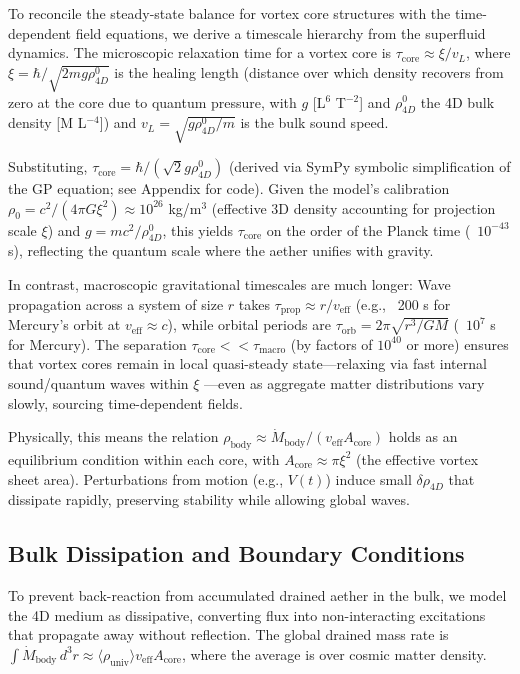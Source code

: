 \documentclass{article}
\begin{document}
To reconcile the steady-state balance for vortex core structures with the time-dependent field equations, we derive a timescale hierarchy from the superfluid dynamics. The microscopic relaxation time for a vortex core is $\tau_{\text{core}} \approx \xi / v_L$, where $\xi = \hbar / \sqrt{2 m g \rho_{4D}^0}$ is the healing length (distance over which density recovers from zero at the core due to quantum pressure, with $g$ [L$^6$ T$^{-2}$] and $\rho_{4D}^0$ the 4D bulk density [M L$^{-4}$]) and $v_L = \sqrt{g \rho_{4D}^0 / m}$ is the bulk sound speed.

Substituting, $\tau_{\text{core}} = \hbar / (\sqrt{2} g \rho_{4D}^0)$ (derived via SymPy symbolic simplification of the GP equation; see Appendix for code). Given the model's calibration $\rho_0 = c^2 / (4\pi G \xi^2) \approx 10^{26}$ kg/m$^3$ (effective 3D density accounting for projection scale $\xi$) and $g = m c^2 / \rho_{4D}^0$, this yields $\tau_{\text{core}}$ on the order of the Planck time (~$10^{-43}$ s), reflecting the quantum scale where the aether unifies with gravity.

In contrast, macroscopic gravitational timescales are much longer: Wave propagation across a system of size $r$ takes $\tau_{\text{prop}} \approx r / v_{\text{eff}}$ (e.g., ~200 s for Mercury's orbit at $v_{\text{eff}} \approx c$), while orbital periods are $\tau_{\text{orb}} = 2\pi \sqrt{r^3 / G M}$ (~$10^{7}$ s for Mercury). The separation $\tau_{\text{core}} << \tau_{\text{macro}}$ (by factors of $10^{40}$ or more) ensures that vortex cores remain in local quasi-steady state---relaxing via fast internal sound/quantum waves within $\xi$ ---even as aggregate matter distributions vary slowly, sourcing time-dependent fields.

Physically, this means the relation $\rho_{\text{body}} \approx \dot{M}_{\text{body}} / (v_{\text{eff}} A_{\text{core}})$ holds as an equilibrium condition within each core, with $A_{\text{core}} \approx \pi \xi^2$ (the effective vortex sheet area). Perturbations from motion (e.g., $V(t)$) induce small $\delta \rho_{4D}$ that dissipate rapidly, preserving stability while allowing global waves.

\subsection{Bulk Dissipation and Boundary Conditions}

To prevent back-reaction from accumulated drained aether in the bulk, we model the 4D medium as dissipative, converting flux into non-interacting excitations that propagate away without reflection. The global drained mass rate is $\int \dot{M}_{\text{body}} \, d^3 r \approx \langle \rho_{\text{univ}} \rangle v_{\text{eff}} A_{\text{core}}$, where the average is over cosmic matter density.
\end{document}
